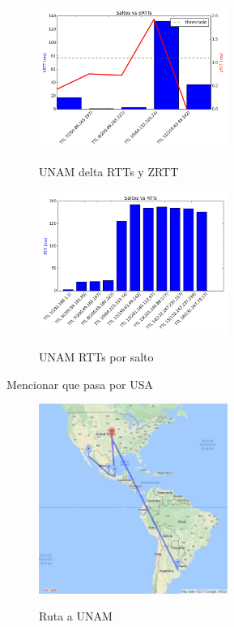 \smallskip
    
\begin{figure}[H]
\centering
\caption{UNAM delta RTTs y ZRTT}
\includegraphics[width=0.55\textwidth]{modules/unam_rtts_2}
 \label{fig:unam_rtts_2}
\end{figure}

\begin{figure}[H]
\centering
\caption{UNAM RTTs por salto}
\includegraphics[width=0.55\textwidth]{modules/unam_rtts_1}
 \label{fig:unam_rtts}
\end{figure}

Mencionar que pasa por USA
\begin{figure}[H]
\centering
\caption{Ruta a UNAM}
\includegraphics[width=0.55\textwidth]{modules/unam_path_1}
 \label{fig:ruta_unam_1}
\end{figure}

